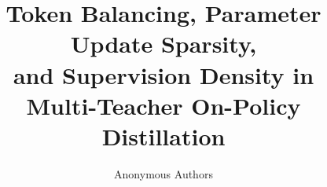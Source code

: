 \documentclass{article} %
\title{Token Balancing, Parameter Update Sparsity,\\and Supervision Density in\\Multi-Teacher On-Policy Distillation}
\author{Anonymous Authors}
\theoremstyle{remark}
\begin{document}
\maketitle















\appendix

\setcounter{table}{0}
\renewcommand{\thetable}{A\arabic{table}}


\end{document}
